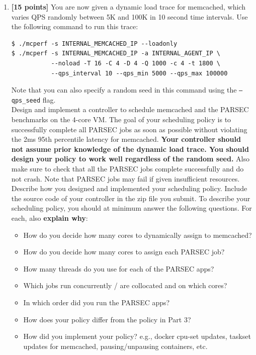 \documentclass[11pt]{article}
\begin{document}
\begin{enumerate}
    \item \textbf{[15 points]} You are now given a dynamic load trace for memcached, which varies QPS randomly between 5K and 100K in 10 second time intervals. Use the following command to run this trace: 
        \begin{Verbatim}[fontsize=\small]
$ ./mcperf -s INTERNAL_MEMCACHED_IP --loadonly 
$ ./mcperf -s INTERNAL_MEMCACHED_IP -a INTERNAL_AGENT_IP \ 
           --noload -T 16 -C 4 -D 4 -Q 1000 -c 4 -t 1800 \ 
           --qps_interval 10 --qps_min 5000 --qps_max 100000
\end{Verbatim}
    
    Note that you can also specify a random seed in this command using the \texttt{--qps\_seed} flag. \\
    
    Design and implement a controller to schedule memcached and the PARSEC benchmarks on the 4-core VM. The goal of your scheduling policy is to successfully complete all PARSEC jobs as soon as possible without violating the 2ms 95th percentile latency for memcached. \textbf{Your controller should not assume prior knowledge of the dynamic load trace. You should design your policy to work well regardless of the random seed.} Also make sure to check that all the PARSEC jobs complete successfully and do not crash. Note that PARSEC jobs may fail if given insufficient resources. \\
    
    Describe how you designed and implemented your scheduling policy. Include the source code of your controller in the zip file you submit. To describe your scheduling policy, you should at minimum answer the following questions. For each, also \textbf{explain why}:
    \begin{itemize}
        \item How do you decide how many cores to dynamically assign to memcached? 
        \item How do you decide how many cores to assign each PARSEC job? 
        \item How many threads do you use for each of the PARSEC apps? 
        \item Which jobs run concurrently / are collocated and on which cores? 
        \item In which order did you run the PARSEC apps? 
        \item How does your policy differ from the policy in Part 3? 
        \item How did you implement your policy? e.g., docker cpu-set updates, taskset updates for memcached, pausing/unpausing containers, etc.
    \end{itemize}
    

\end{enumerate}
\end{document}
